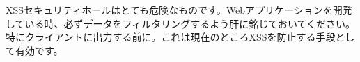 XSSセキュリティホールはとても危険なものです。Webアプリケーションを開発している時、必ずデータをフィルタリングするよう肝に銘じておいてください。特にクライアントに出力する前に。これは現在のところXSSを防止する手段として有効です。
